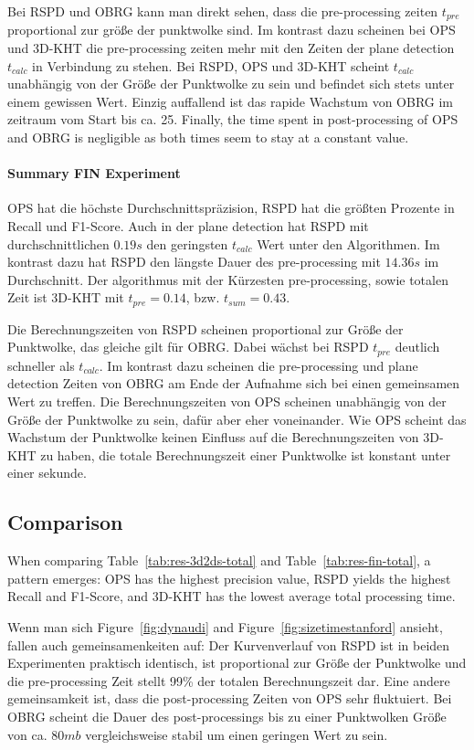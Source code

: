 \documentclass[main.tex]{subfiles}
\begin{document}
Bei RSPD und OBRG kann man direkt sehen, dass die pre-processing zeiten $t_{pre}$ proportional zur größe der punktwolke
sind. Im kontrast dazu scheinen bei OPS und 3D-KHT die pre-processing zeiten mehr mit den Zeiten der plane detection
$t_{calc}$ in Verbindung zu stehen. Bei RSPD, OPS und 3D-KHT scheint $t_{calc}$ unabhängig von der Größe der Punktwolke
zu sein und befindet sich stets unter einem gewissen Wert. Einzig auffallend ist das rapide Wachstum von OBRG im zeitraum
vom Start bis ca. 25.
Finally, the time spent in post-processing of OPS and OBRG is negligible as both times seem to stay at a constant
value.

\paragraph{Summary FIN Experiment}
OPS hat die höchste Durchschnittspräzision, RSPD hat die größten Prozente in Recall und F1-Score. Auch in der plane detection
hat RSPD mit durchschnittlichen $0.19s$ den geringsten $t_{calc}$ Wert unter den Algorithmen. Im kontrast dazu hat RSPD 
den längste Dauer des pre-processing mit $14.36s$ im Durchschnitt. Der algorithmus mit der Kürzesten pre-processing, sowie
totalen Zeit ist 3D-KHT mit $t_{pre}=0.14$, bzw. $t_{sum}=0.43$.

Die Berechnungszeiten von RSPD scheinen proportional zur Größe der Punktwolke, das gleiche gilt für OBRG. 
Dabei wächst bei RSPD $t_{pre}$ deutlich schneller als $t_{calc}$. Im kontrast dazu scheinen die pre-processing
und plane detection Zeiten von OBRG am Ende der Aufnahme sich bei einen gemeinsamen Wert zu treffen.  
Die Berechnungszeiten von OPS scheinen unabhängig von der Größe der Punktwolke zu sein, dafür aber eher voneinander. 
Wie OPS scheint das Wachstum der Punktwolke keinen Einfluss auf die Berechnungszeiten von 3D-KHT zu haben, die totale 
Berechnungszeit einer Punktwolke ist konstant unter einer sekunde.

\subsection{Comparison}
When comparing Table~\ref{tab:res-3d2ds-total} and Table~\ref{tab:res-fin-total}, a pattern emerges:
OPS has the highest precision value, RSPD yields the highest Recall and F1-Score, and 3D-KHT has the lowest 
average total processing time.

Wenn man sich Figure~\ref{fig:dynaudi} and Figure~\ref{fig:sizetimestanford} ansieht, fallen auch gemeinsamenkeiten auf:
Der Kurvenverlauf von RSPD ist in beiden Experimenten praktisch identisch, ist proportional zur Größe der Punktwolke 
und die pre-processing Zeit stellt 99\% der totalen Berechnungszeit dar.
Eine andere gemeinsamkeit ist, dass die post-processing Zeiten von OPS sehr fluktuiert. Bei OBRG scheint die Dauer des 
post-processings bis zu einer Punktwolken Größe von ca. $80mb$ vergleichsweise stabil um einen geringen Wert zu sein.
\end{document}
